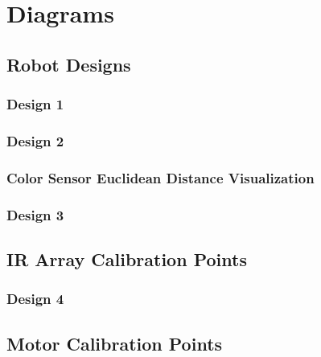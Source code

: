 \documentclass[12pt]{report}
\begin{document}
\chapter{Diagrams}

\section{Robot Designs}

\subsection{Design 1}
\label{sc:color-sensor-points}


\subsection{Design 2}
\subsection{Color Sensor Euclidean Distance Visualization}
\label{sc:color-sensor-visualization}


\subsection{Design 3}
\section{IR Array Calibration Points}
\label{sc:ir-array-points}


\subsection{Design 4}
\section{Motor Calibration Points}
\label{sc:motor-points}

\end{document}

